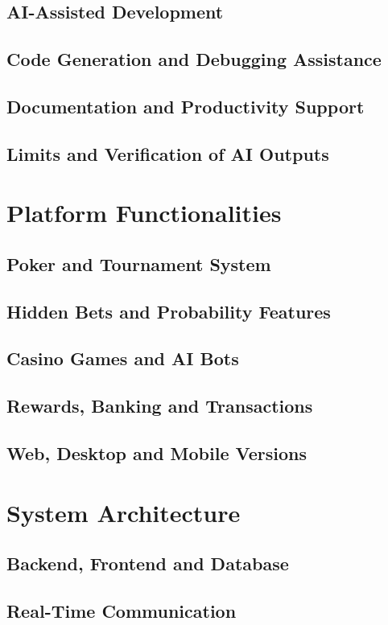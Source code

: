 \documentclass[11pt,a4paper]{article}
\begin{document}
\subsection{AI-Assisted Development}
\subsection{Code Generation and Debugging Assistance}
\subsection{Documentation and Productivity Support}
\subsection{Limits and Verification of AI Outputs}
\newpage
\section{Platform Functionalities}
\subsection{Poker and Tournament System}
\subsection{Hidden Bets and Probability Features}
\subsection{Casino Games and AI Bots}
\subsection{Rewards, Banking and Transactions}
\subsection{Web, Desktop and Mobile Versions}
\newpage
\section{System Architecture}
\subsection{Backend, Frontend and Database}
\subsection{Real-Time Communication}
\end{document}
